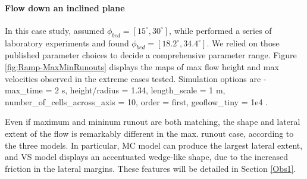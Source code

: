 \documentclass{article}
\begin{document}
\paragraph{Flow down an inclined plane}
In this case study, \cite{Dalbey2008} assumed $\phi_{bed}=[15^\mathrm{\circ}, 30^\mathrm{\circ}]$, while \cite{WebbBursik2016} performed a series of laboratory experiments and found $\phi_{bed}=[18.2^\mathrm{\circ}, 34.4^\mathrm{\circ}]$. We relied on those published parameter choices to decide a comprehensive parameter range. Figure \ref{fig:Ramp-MaxMinRunouts} displays the maps of max flow height and max velocities observed in the extreme cases tested. Simulation options are - max\_time = 2 s, height/radius = 1.34, length\_scale = 1 m, number\_of\_cells\_across\_axis = 10, order = first, geoflow\_tiny = 1e4 \citep{Patra2005,Aghakhani2016}.


Even if maximum and mininum runout are both matching, the shape and lateral extent of the flow is remarkably different in the max. runout case, according to the three models. In particular, MC model can produce the largest lateral extent, and VS model displays an accentuated wedge-like shape, due to the increased friction in the lateral margins. These features will be detailed in Section \ref{Obs1}.
\end{document}
